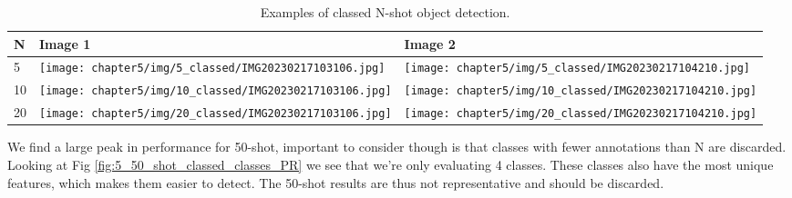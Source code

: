 \begin{table}[H]
    \begin{adjustwidth}{-0.5in}{-0.5in}
        \centering
        \captionsetup{justification=centering}
        \begin{tabular}{|l|ll|}
            \hline
            N & Image 1 & Image 2 \\ \hline
            5 & \texttt{[image: chapter5/img/5\_classed/IMG20230217103106.jpg]} & \texttt{[image: chapter5/img/5\_classed/IMG20230217104210.jpg]} \\ \hline
            10 & \texttt{[image: chapter5/img/10\_classed/IMG20230217103106.jpg]} & \texttt{[image: chapter5/img/10\_classed/IMG20230217104210.jpg]} \\ \hline
            20 & \texttt{[image: chapter5/img/20\_classed/IMG20230217103106.jpg]} & \texttt{[image: chapter5/img/20\_classed/IMG20230217104210.jpg]} \\ \hline
        \end{tabular}
        \caption{Examples of classed N-shot object detection.}
        \label{fig:5_n_shot_examples}
    \end{adjustwidth}
\end{table}


We find a large peak in performance for 50-shot, important to consider though is that classes with fewer annotations than N are discarded. Looking at Fig \ref{fig:5_50_shot_classed_classes_PR} we see that we're only evaluating 4 classes. These classes also have the most unique features, which makes them easier to detect. The 50-shot results are thus not representative and should be discarded.

